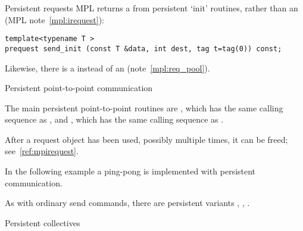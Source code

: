 \begin{mplnote}{Persistent requests}
  MPL returns a 
  from persistent `init' routines, rather than an 
  (MPL note~\ref{mpl:irequest}):
\begin{lstlisting}
template<typename T >
prequest send_init (const T &data, int dest, tag t=tag(0)) const;
\end{lstlisting}
Likewise, there is a 
instead of an  (note~\ref{mpl:req_pool}).
\end{mplnote}

 {Persistent point-to-point communication}

The main persistent point-to-point routines are
, which has the same calling sequence as
  , and , which has the same
  calling sequence as .
  
After a request object has been used, possibly multiple times, it can
be freed; see~\ref{ref:mpirequest}.

In the following example a ping-pong is implemented with persistent communication.
%

As with ordinary send commands, there are persistent variants
,
,
.


 {Persistent collectives}

